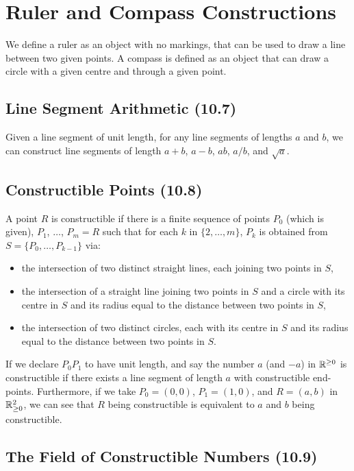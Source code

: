 \section{Ruler and Compass Constructions}

We define a ruler as an object with no markings, that can be used to draw a line
between two given points. A compass is defined as an object that can draw a circle
with a given centre and through a given point.

\subsection{Line Segment Arithmetic (10.7)} \label{10.7}

Given a line segment of unit length, for any line segments of lengths $a$ and $b$, we
can construct line segments of length $a + b$, $a - b$, $ab$, $a / b$, and $\sqrt{a}$.

\subsection{Constructible Points (10.8)} \label{10.8}

A point $R$ is constructible if there is a finite sequence of points $P_0$ (which is given),
$P_1$, $\ldots$, $P_m = R$ such that for each $k$ in $\{2, \ldots, m\}$, $P_k$ is obtained
from $S = \{P_0, \ldots, P_{k-1}\}$ via: \begin{itemize}
    \item the intersection of two distinct straight lines,
        each joining two points in $S$,
    \item the intersection of a straight line joining two points in $S$ and
        a circle with its centre in $S$ and its radius equal to the distance between
        two points in $S$,
    \item the intersection of two distinct circles, each with its centre in $S$ and
        its radius equal to the distance between two points in $S$.
\end{itemize} If we declare $P_0P_1$ to have unit length, and say the number $a$
(and $-a$) in $\mathbb{R}^{\geq 0}$ is constructible if there exists a line segment of
length $a$ with constructible end-points. Furthermore, if we take $P_0 = (0, 0)$,
$P_1 = (1, 0)$, and $R = (a, b)$ in $\mathbb{R}_{\geq 0}^2$, we can see that
$R$ being constructible is equivalent to $a$ and $b$ being constructible.

\subsection{The Field of Constructible Numbers (10.9)} \label{10.9}

